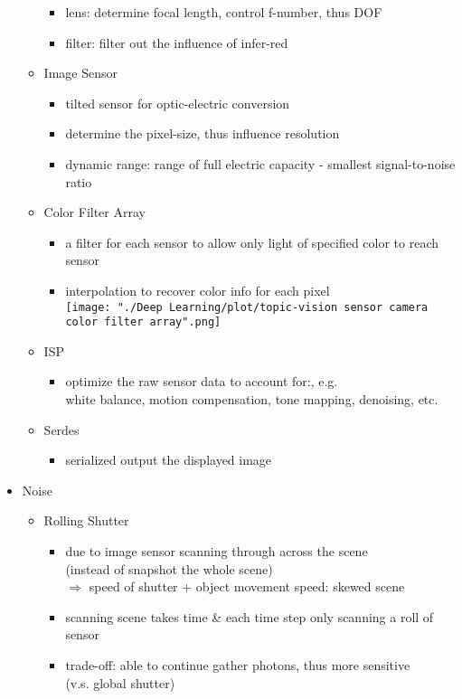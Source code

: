 \begin{itemize}
\begin{itemize}
\begin{itemize}
		\item lens: determine focal length, control f-number, thus DOF
		\item filter: filter out the influence of infer-red
		\end{itemize}
	\item Image Sensor
		\begin{itemize}
		\item tilted sensor for optic-electric conversion
		\item determine the pixel-size, thus influence resolution
		\item dynamic range: range of full electric capacity - smallest signal-to-noise ratio
		\end{itemize}
	\item Color Filter Array
		\begin{itemize}
		\item a filter for each sensor to allow only light of specified color to reach sensor
		\item interpolation to recover color info for each pixel \\
		\texttt{[image: "./Deep Learning/plot/topic-vision sensor camera color filter array".png]}
		\end{itemize} 
	\item ISP
		\begin{itemize}
		\item optimize the raw sensor data to account for:, e.g. \\
		white balance, motion compensation, tone mapping, denoising, etc.
		\end{itemize}
	\item Serdes
		\begin{itemize}
		\item serialized output the displayed image
		\end{itemize}
	\end{itemize}
\item Noise
	\begin{itemize}
	\item Rolling Shutter
		\begin{itemize}
		\item due to image sensor scanning through across the scene \\
		(instead of snapshot the whole scene) \\
		$\Rightarrow$ speed of shutter $+$ object movement speed: skewed scene
		\item scanning scene takes time \& each time step only scanning a roll of sensor
		\item trade-off: able to continue gather photons, thus more sensitive \\
		(v.s. global shutter)
		\end{itemize}
	\end{itemize}
\end{itemize}

